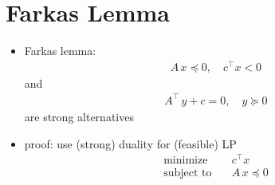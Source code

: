 \documentclass[11pt]{extarticle}
\theoremstyle{definition}
\begin{document}
\newpage

\section*{Farkas Lemma}

\begin{itemize}
  \item Farkas lemma:
    \begin{align*}
      A\,x\preccurlyeq 0, \quad c^\top x < 0
    \end{align*}
    and
    \begin{align*}
      A^\top\,y + c = 0, \quad y\succcurlyeq 0
    \end{align*}
    are strong alternatives
  \item proof: use (strong) duality for (feasible) LP
    \begin{align*}
      \text{minimize}\quad & c^\top x \\
      \text{subject to}\quad & A\,x\preccurlyeq 0
    \end{align*}
\end{itemize}

\newpage



\end{document}
